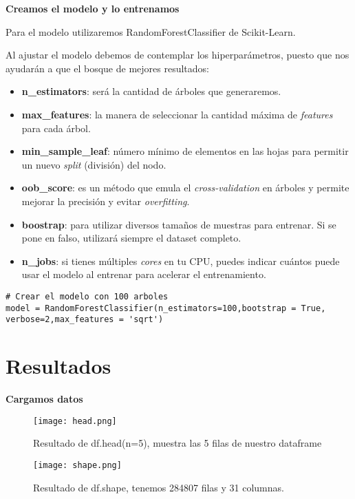 \documentclass{article}
\begin{document}
\textbf{Creamos el modelo y lo entrenamos}

Para el modelo utilizaremos RandomForestClassifier de Scikit-Learn.

Al ajustar el modelo debemos de contemplar los hiperparámetros, puesto que nos ayudarán a que el bosque de mejores resultados:
\begin{itemize}
    \item \textbf{n\_estimators}: será la cantidad de árboles que generaremos.
    \item \textbf{max\_features}: la manera de seleccionar la cantidad máxima de \textit{features} para cada árbol.
    \item \textbf{min\_sample\_leaf}: número mínimo de elementos en las hojas para permitir un nuevo \textit{split} (división) del nodo.
    \item \textbf{oob\_score}: es un método que emula el \textit{cross-validation} en árboles y permite mejorar la precisión y evitar \textit{overfitting}.
    \item \textbf{boostrap}: para utilizar diversos tamaños de muestras para entrenar. Si se pone en falso, utilizará siempre el dataset completo.
    \item \textbf{n\_jobs}: si tienes múltiples \textit{cores} en tu CPU, puedes indicar cuántos puede usar el modelo al entrenar para acelerar el entrenamiento.
\end{itemize}

\begin{lstlisting}
# Crear el modelo con 100 arboles
model = RandomForestClassifier(n_estimators=100,bootstrap = True, verbose=2,max_features = 'sqrt')
\end{lstlisting}


\section{Resultados}

\textbf{Cargamos datos}

\begin{figure}[H]
\centering
\texttt{[image: head.png]}
\caption{ {\small Resultado de df.head(n=5), muestra las 5 filas de nuestro dataframe }}
\label{figura01}
\end{figure}

\begin{figure}[H]
\centering
\texttt{[image: shape.png]}
\caption{ {\small Resultado de df.shape, tenemos 284807 filas y 31 columnas. }}
\label{figura01}
\end{figure}
\end{document}
